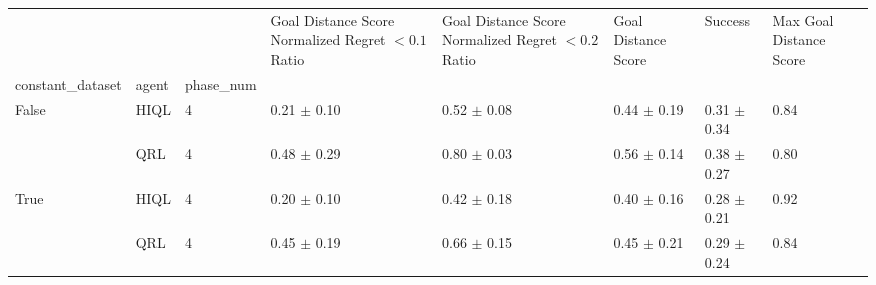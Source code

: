 \begin{tabular}{llllllll}
\toprule
 &  &  & Goal Distance Score Normalized Regret $< 0.1$ Ratio & Goal Distance Score Normalized Regret $< 0.2$ Ratio & Goal Distance Score & Success & Max Goal Distance Score \\
constant_dataset & agent & phase_num &  &  &  &  &  \\
\midrule
\multirow[t]{2}{*}{False} & HIQL & 4 & 0.21 $\pm$ 0.10 & 0.52 $\pm$ 0.08 & 0.44 $\pm$ 0.19 & 0.31 $\pm$ 0.34 & 0.84 \\
\cline{2-8}
 & QRL & 4 & 0.48 $\pm$ 0.29 & 0.80 $\pm$ 0.03 & 0.56 $\pm$ 0.14 & 0.38 $\pm$ 0.27 & 0.80 \\
\cline{1-8} \cline{2-8}
\multirow[t]{2}{*}{True} & HIQL & 4 & 0.20 $\pm$ 0.10 & 0.42 $\pm$ 0.18 & 0.40 $\pm$ 0.16 & 0.28 $\pm$ 0.21 & 0.92 \\
\cline{2-8}
 & QRL & 4 & 0.45 $\pm$ 0.19 & 0.66 $\pm$ 0.15 & 0.45 $\pm$ 0.21 & 0.29 $\pm$ 0.24 & 0.84 \\
\cline{1-8} \cline{2-8}
\bottomrule
\end{tabular}
